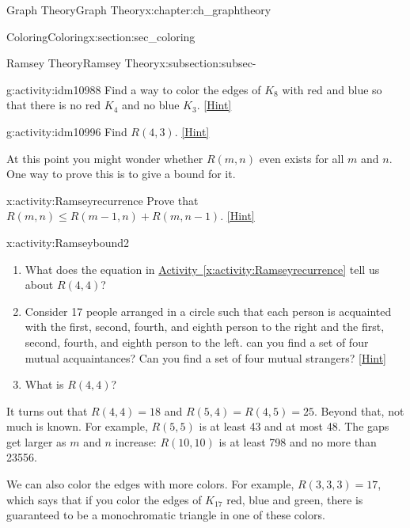 \documentclass[oneside,10pt,]{book}
\numberwithin{equation}{chapter}
\begin{document}
\begin{chapterptx}{Graph Theory}{}{Graph Theory}{}{}{x:chapter:ch_graphtheory}
\begin{sectionptx}{Coloring}{}{Coloring}{}{}{x:section:sec_coloring}
\begin{subsectionptx}{Ramsey Theory}{}{Ramsey Theory}{}{}{x:subsection:subsec-}
\begin{activity}{}{g:activity:idm10988}
Find a way to color the edges of \(K_8\) with red and blue so that there is no red \(K_4\) and no blue \(K_3\).%
\space\hspace*{0pt}\hfill{\tiny\hyperlink{g:hint:idm10994-back}{[Hint]}}\end{activity}
\begin{activity}{}{g:activity:idm10996}%
Find \(R(4,3)\).%
\space\hspace*{0pt}\hfill{\tiny\hyperlink{g:hint:idm11000-back}{[Hint]}}\end{activity}
At this point you might wonder whether \(R(m,n)\) even exists for all \(m\) and \(n\).  One way to prove this is to give a bound for it.%
\begin{activity}{}{x:activity:Ramseyrecurrence}%
Prove that \(R(m,n)\le R(m-1,n) + R(m,n-1)\).%
\space\hspace*{0pt}\hfill{\tiny\hyperlink{g:hint:idm11015-back}{[Hint]}}\end{activity}
\begin{activity}{}{x:activity:Ramseybound2}%
\begin{enumerate}[font=\bfseries,label=(\alph*),ref=\alph*]
\item{}What does the equation in \hyperref[x:activity:Ramseyrecurrence]{Activity~\ref{x:activity:Ramseyrecurrence}} tell us about \(R(4,4)\)?%
\item{}Consider 17 people arranged in a circle such that each person is acquainted with the first, second, fourth, and eighth person to the right and the first, second, fourth, and eighth person to the left.  can you find a set of four mutual acquaintances?  Can you find a set of four mutual strangers?%
\space\hspace*{0pt}\hfill{\tiny\hyperlink{g:hint:idm11059-back}{[Hint]}}\item{}What is \(R(4,4)\)?%
\end{enumerate}
\end{activity}
It turns out that \(R(4,4) = 18\) and \(R(5, 4) = R(4,5) = 25\).  Beyond that, not much is known.  For example, \(R(5,5)\) is at least 43 and at most 48.  The gaps get larger as \(m\) and \(n\) increase: \(R(10,10)\) is at least 798 and no more than 23556.%
\par
We can also color the edges with more colors.  For example, \(R(3,3,3) = 17\), which says that if you color the edges of \(K_{17}\) red, blue and green, there is guaranteed to be a monochromatic triangle in one of these colors.%
\end{subsectionptx}
\end{sectionptx}

\end{chapterptx}
\end{document}
